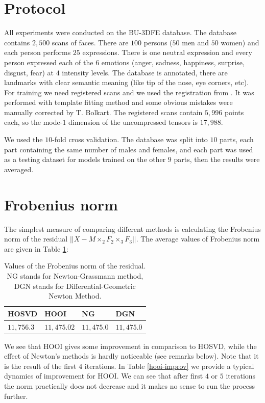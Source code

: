 \section{Protocol}

All experiments were conducted on the BU-3DFE database. The database contains $2,500$ scans of faces. There are $100$
persons ($50$ men and $50$ women) and each person performs $25$ expressions.
There is one neutral expression and every person expressed each of the $6$ emotions (anger, sadness,
happiness, surprise, disgust, fear) at $4$ intensity levels. The database is annotated, there are landmarks
with clear semantic meaning (like tip of the nose, eye corners, etc).
For training we need registered scans and we used the registration 
from \cite{Salazar}. It was performed with template fitting method
and some obvious mistakes were manually corrected by T. Bolkart.
The registered scans contain $5,996$ points each, so the mode-$1$ dimension
of the  uncompressed tensors is $17,988$.

We used the {$10$-fold} cross validation. 
The database was split into $10$ parts, each part containing the same number of males and females, and
each part was used as a testing dataset for models trained on the other $9$ parts, then the results
were averaged.

\section{Frobenius norm}

The simplest measure of comparing different methods
is calculating the Frobenius norm of the residual $|| X - M \times_2 F_2 \times_3 F_3 ||$.
The average values of Frobenius norm are given in {Table \ref{frob-norm-residual}}:


\begin{table}[h]
\centering
\begin{tabular}{|l|l|l|l|}
\hline
HOSVD & HOOI & NG & DGN \\ \hline
$11,756.3$  & $11,475.02$  & $11,475.0$ & $11,475.0$ \\ \hline
\end{tabular}
\caption{Values of the Frobenius norm of the residual. NG stands for Newton-Grassmann method, DGN stands for Differential-Geometric Newton Method.}
\label{frob-norm-residual}
\end{table}


We see that HOOI gives some improvement in comparison to HOSVD,
while the effect of Newton's methods is hardly noticeable (see remarks below). Note that it is the result of the
first $4$ iterations. In {Table \ref{hooi-improv}} we provide a typical dynamics of improvement
for HOOI. We can see that  after first $4$ or $5$ iterations the norm practically 
does not decrease and it makes no sense to run the process further.


